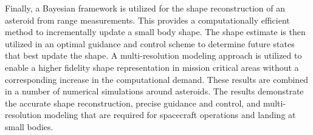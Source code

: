 \documentclass{article}
\begin{document}
Finally, a Bayesian framework is utilized for the shape reconstruction of an asteroid from range measurements. 
This provides a computationally efficient method to incrementally update a small body shape. 
The shape estimate is then utilized in an optimal guidance and control scheme to determine future states that best update the shape.
A multi-resolution modeling approach is utilized to enable a higher fidelity shape representation in mission critical areas without a corresponding increase in the computational demand.
These results are combined in a number of numerical simulations around asteroids.
The results demonstrate the accurate shape reconstruction, precise guidance and control, and multi-resolution modeling that are required for spacecraft operations and landing at small bodies.
\end{document}
